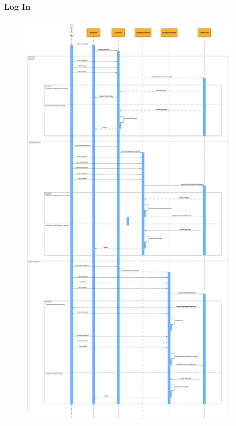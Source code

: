     \newpage
    \subsubsection{Log In}
    \begin{center}
    \begin{figure}[!htp]
    \begin{center}
     \includegraphics[scale=.21]{images/Task2/SequenceDiagrams/LogIn.pdf}
    \end{center}
    \label{refhinh1}
    \end{figure}
    \end{center}

